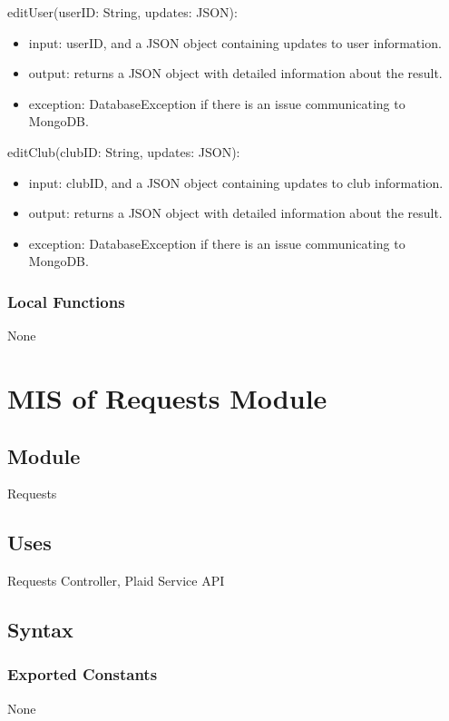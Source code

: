 \documentclass[12pt, titlepage]{article}
\begin{document}
\noindent editUser(userID: String, updates: JSON):
\begin{itemize}
  \item input: userID, and a JSON object containing updates to user information.
  \item output: returns a JSON object with detailed information about the result.
  \item exception: DatabaseException if there is an issue communicating to MongoDB.
\end{itemize}

\noindent editClub(clubID: String, updates: JSON):
\begin{itemize}
  \item input: clubID, and a JSON object containing updates to club information.
  \item output: returns a JSON object with detailed information about the result.
  \item exception: DatabaseException if there is an issue communicating to MongoDB.
\end{itemize}

\subsubsection{Local Functions}
None

\section{MIS of Requests Module} \label{RequestsModule}

\subsection{Module}
Requests

\subsection{Uses}
Requests Controller, Plaid Service API

\subsection{Syntax}

\subsubsection{Exported Constants}
None
\end{document}
